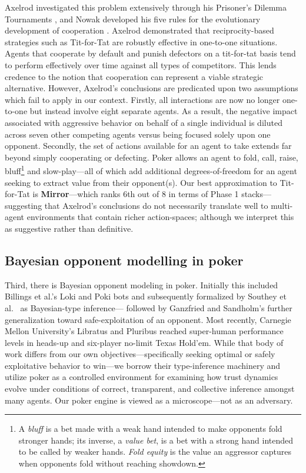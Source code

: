 \documentclass[10pt,twocolumn,letterpaper]{article}
\newcommand{\arch}[1]{\textbf{#1}}
\begin{document}
Axelrod investigated this problem extensively through his Prisoner's
Dilemma Tournaments \citep{axelrod1984evolution}, and Nowak
developed his five rules for the evolutionary development of
cooperation \citep{nowak2006five}. Axelrod demonstrated that
reciprocity-based strategies such as Tit-for-Tat are robustly
effective in one-to-one situations. Agents that cooperate by default
and punish defectors on a tit-for-tat basis tend to perform
effectively over time against all types of competitors. This lends
credence to the notion that cooperation can represent a viable
strategic alternative. However, Axelrod's conclusions are predicated
upon two assumptions which fail to apply in our context. Firstly,
all interactions are now no longer one-to-one but instead involve
eight separate agents. As a result, the negative impact associated
with aggressive behavior on behalf of a single individual is diluted
across seven other competing agents versus being focused solely upon
one opponent. Secondly, the set of actions available for an agent to
take extends far beyond simply cooperating or defecting. Poker
allows an agent to fold, call, raise,
bluff\footnote{A \textit{bluff} is a bet made with a weak hand
intended to make opponents fold stronger hands; its inverse, a
\textit{value bet}, is a bet with a strong hand intended to be
called by weaker hands. \textit{Fold equity} is the value an
aggressor captures when opponents fold without reaching showdown.}
and slow-play---all of which add additional degrees-of-freedom for
an agent seeking to extract value from their opponent(s). Our best
approximation to Tit-for-Tat is \arch{Mirror}---which ranks 6th out
of 8 in terms of Phase 1 stacks---suggesting that Axelrod's conclusions do
not necessarily translate well to multi-agent environments that
contain richer action-spaces; although we interpret this as
suggestive rather than definitive.

\subsection{Bayesian opponent modelling in poker}
Third, there is Bayesian opponent modeling in poker. Initially
this included Billings et al.'s Loki and Poki bots
\citep{billings1998opponent} and subsequently formalized by Southey
et al.\ \citep{southey2005bayes} as Bayesian-type inference---
followed by Ganzfried and Sandholm's \citep{ganzfried2015safe}
further generalization toward safe-exploitation of an opponent. Most
recently, Carnegie Mellon University's Libratus and Pluribus
\citep{brown2018superhuman,brown2019superhuman} reached super-human
performance levels in heads-up and six-player no-limit Texas
Hold'em. While that body of work differs from our own
objectives---specifically seeking optimal or safely exploitative
behavior to win---we borrow their type-inference machinery and
utilize poker as a controlled environment for examining how trust
dynamics evolve under conditions of correct, transparent, and
collective inference amongst many agents. Our poker engine is viewed
as a microscope---not as an adversary.
\end{document}
